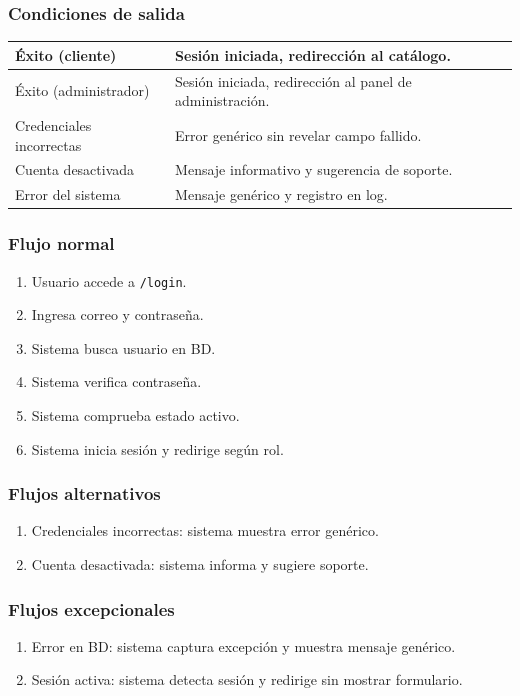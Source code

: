 \documentclass[12pt,a4paper]{article}
\begin{document}
\subsubsection*{Condiciones de salida}
\begin{longtable}{|l|p{10cm}|}
    \hline
    Éxito (cliente)          & Sesión iniciada, redirección al catálogo.                \\ \hline
    Éxito (administrador)    & Sesión iniciada, redirección al panel de administración. \\ \hline
    Credenciales incorrectas & Error genérico sin revelar campo fallido.                \\ \hline
    Cuenta desactivada       & Mensaje informativo y sugerencia de soporte.             \\ \hline
    Error del sistema        & Mensaje genérico y registro en log.                      \\ \hline
\end{longtable}

\subsubsection*{Flujo normal}
\begin{enumerate}[label=FN-\arabic*]
    \item Usuario accede a \texttt{/login}.
    \item Ingresa correo y contraseña.
    \item Sistema busca usuario en BD.
    \item Sistema verifica contraseña.
    \item Sistema comprueba estado activo.
    \item Sistema inicia sesión y redirige según rol.
\end{enumerate}

\subsubsection*{Flujos alternativos}
\begin{enumerate}[label=FA-\arabic*]
    \item Credenciales incorrectas: sistema muestra error genérico.
    \item Cuenta desactivada: sistema informa y sugiere soporte.
\end{enumerate}

\subsubsection*{Flujos excepcionales}
\begin{enumerate}[label=FE-\arabic*]
    \item Error en BD: sistema captura excepción y muestra mensaje genérico.
    \item Sesión activa: sistema detecta sesión y redirige sin mostrar formulario.
\end{enumerate}
\end{document}
